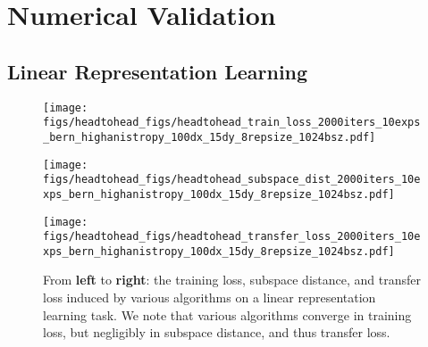 \section{Numerical Validation}\label{sec:numerical_validation}
\subsection{Linear Representation Learning}



\begin{figure*}[t]
\centering
\begin{minipage}{0.32\textwidth}
    \centering
    \texttt{[image: figs/headtohead\_figs/headtohead\_train\_loss\_2000iters\_10exps\_bern\_highanistropy\_100dx\_15dy\_8repsize\_1024bsz.pdf]}
\end{minipage}%
\begin{minipage}{0.32\textwidth}
    \centering
    \texttt{[image: figs/headtohead\_figs/headtohead\_subspace\_dist\_2000iters\_10exps\_bern\_highanistropy\_100dx\_15dy\_8repsize\_1024bsz.pdf]}
\end{minipage}%
\begin{minipage}{0.32\textwidth}
    \centering
    \texttt{[image: figs/headtohead\_figs/headtohead\_transfer\_loss\_2000iters\_10exps\_bern\_highanistropy\_100dx\_15dy\_8repsize\_1024bsz.pdf]}
\end{minipage}%
\caption{
From \textbf{left} to \textbf{right}: the training loss, subspace distance, and transfer loss induced by various algorithms on a linear representation learning task. We note that various algorithms converge in training loss, but negligibly in subspace distance, and thus transfer loss.
}
\label{fig:headtohead}
\end{figure*}

